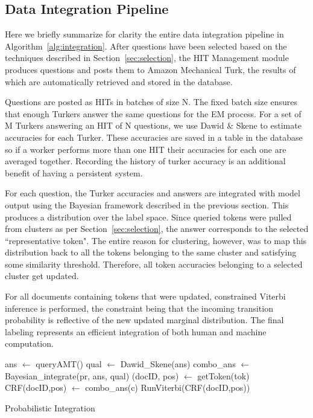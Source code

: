 \subsection{Data Integration Pipeline}

Here we briefly summarize for clarity the entire data integration pipeline in Algorithm~\ref{alg:integration}.  After questions have been selected based on the techniques described in Section~\ref{sec:selection}, the HIT Management module produces questions and posts them to Amazon Mechanical Turk, the results of which are automatically retrieved and stored in the database.

Questions are posted as HITs in batches of size N.  The fixed batch size ensures that enough Turkers answer the same questions for the EM process.  For a set of M Turkers answering an HIT of N questions, we use Dawid \& Skene to estimate accuracies for each Turker.  These accuracies are saved in a table in the database so if a worker performs more than one HIT their accuracies for each one are averaged together.  Recording the history of turker accuracy is an additional benefit of having a persistent system.

For each question, the Turker accuracies and answers are integrated with model output using the Bayesian framework described in the previous section.  This produces a distribution over the label space.  Since queried tokens were pulled from clusters as per Section~\ref{sec:selection}, the answer corresponds to the selected ``representative token".  The entire reason for clustering, however, was to map this distribution back to all the tokens belonging to the same cluster and satisfying some similarity threshold.  Therefore, all token accuracies belonging to a selected cluster get updated.

For all documents containing tokens that were updated, constrained Viterbi inference is performed, the constraint being that the incoming transition probability is reflective of the new updated marginal distribution.  The final labeling represents an efficient integration of both human and machine computation. 

\begin{algorithm}[fillcomment]
\label{alg:integration}
\BlankLine
{}\;
\lnl{}ans $\leftarrow$ queryAMT()\;
\;
\lnl{}qual $\leftarrow$ Dawid\_Skene(ans)\;
\;
\lnl{}combo\_ans $\leftarrow$ Bayesian\_integrate(pr, ans, qual)\;
\;
{
        {
            \lnl{}(docID, pos) $\leftarrow$ getToken(tok)\;
            \lnl{}CRF(docID,pos) $\leftarrow$ combo\_ans(c)\;
	 \lnl{}RunViterbi(CRF(docID,pos))\;
        }  
}
\caption{Probabilistic Integration}
\end{algorithm}

